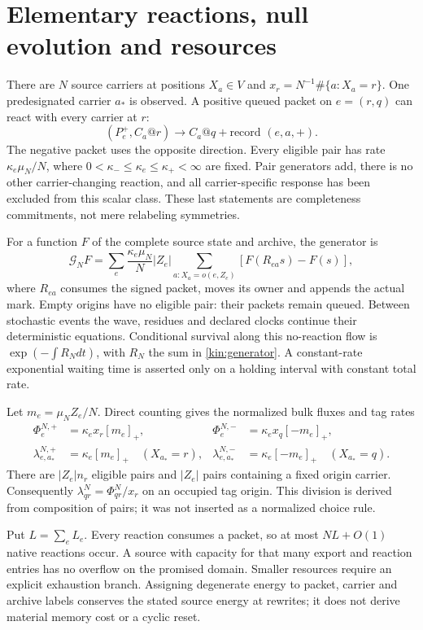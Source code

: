\documentclass[11pt,oneside,openany]{book}
\theoremstyle{definition}
\theoremstyle{remark}\newtheorem{remark}[theorem]{Remark}
\begin{document}
\section{Elementary reactions, null evolution and resources}
There are $N$ source carriers at positions $X_a\in V$ and
$x_r=N^{-1}\#\{a:X_a=r\}$. One predesignated carrier $a_*$ is observed.
A positive queued packet on $e=(r,q)$ can react with every carrier at $r$:
\[
 (P_e^+,C_a@r)\longrightarrow C_a@q+\text{record }(e,a,+).
\]
The negative packet uses the opposite direction. Every eligible pair has
rate $\kappa_e\mu_N/N$, where
$0<\kappa_-\le\kappa_e\le\kappa_+<\infty$ are fixed. Pair generators add,
there is no other carrier-changing reaction, and all carrier-specific
response has been excluded from this scalar class. These last statements
are completeness commitments, not mere relabeling symmetries.

For a function $F$ of the complete source state and archive, the generator is
\begin{equation}
 \mathcal G_NF=
 \sum_e\frac{\kappa_e\mu_N}{N}|Z_e|
 \sum_{a:X_a=o(e,Z_e)}[F(R_{ea}s)-F(s)],
 \label{kin:generator}
\end{equation}
where $R_{ea}$ consumes the signed packet, moves its owner and appends the
actual mark. Empty origins have no eligible pair: their packets remain
queued. Between stochastic events the wave, residues and declared clocks
continue their deterministic equations. Conditional survival along this
no-reaction flow is $\exp(-\int R_Ndt)$, with $R_N$ the sum in
\eqref{kin:generator}. A constant-rate exponential waiting time is asserted
only on a holding interval with constant total rate.

Let $m_e=\mu_N Z_e/N$. Direct counting gives the normalized bulk fluxes
and tag rates
\begin{align}
 \Phi_e^{N,+}&=\kappa_e x_r[m_e]_+,&
 \Phi_e^{N,-}&=\kappa_e x_q[-m_e]_+,\label{kin:flux}\\
 \lambda_{e,a_*}^{N,+}&=\kappa_e[m_e]_+\quad(X_{a_*}=r),&
 \lambda_{e,a_*}^{N,-}&=\kappa_e[-m_e]_+\quad(X_{a_*}=q).
 \label{kin:tagrate}
\end{align}
There are $|Z_e|n_r$ eligible pairs and $|Z_e|$ pairs containing a fixed
origin carrier. Consequently $\lambda_{qr}^N=\Phi_{qr}^N/x_r$ on an
occupied tag origin. This division is derived from composition of pairs;
it was not inserted as a normalized choice rule.

Put $L=\sum_eL_e$. Every reaction consumes a packet, so at most
$NL+O(1)$ native reactions occur. A source with capacity for that many
export and reaction entries has no overflow on the promised domain.
Smaller resources require an explicit exhaustion branch. Assigning
degenerate energy to packet, carrier and archive labels conserves the
stated source energy at rewrites; it does not derive material memory cost
or a cyclic reset.
\end{document}
